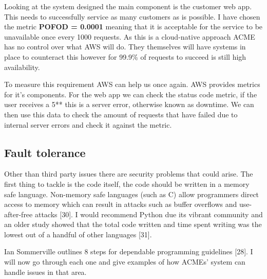   Looking at the system designed the main component is the customer web app. This needs to successfully service as many customers as is possible.
  I have chosen the metric \textbf{POFOD = 0.0001} meaning that it is acceptable for the service to be unavailable once every 1000 requests. As this is a 
  cloud-native approach ACME has no control over what AWS will do. They themselves will have systems in place to counteract this however for 99.9\% of
  requests to succeed is still high availability.

  To measure this requirement AWS can help us once again. AWS provides metrics for it's components. For the web app we can check the status code
  metric, if the user receives a 5** this is a server error, otherwise known as downtime. We can then use this data to check the amount of requests that 
  have failed due to internal server errors and check it against the metric.

  \subsection{Fault tolerance}
  Other than third party issues there are security problems that could arise. The first thing to tackle is the code itself, the code should be written in 
  a memory safe language. Non-memory safe languages (such as C) allow programmers direct access to memory which can result in attacks such as buffer
  overflows and use-after-free attacks [30]. I would recommend Python due its  vibrant community and an older study showed
  that the total code written and time spent writing was the lowest out of a handful of other languages [31].

  Ian Sommerville outlines 8 steps for dependable programming guidelines [28]. I will now go through each one and give examples of how ACMEs' system can 
  handle issues in that area.

